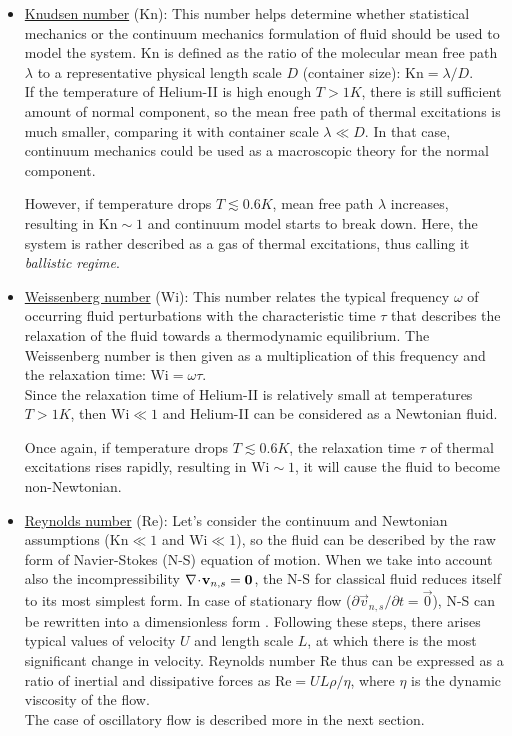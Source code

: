 \begin{itemize}
	\item \underline{Knudsen number} (Kn): This number helps determine whether statistical mechanics or the continuum mechanics formulation of fluid should be used to model the system. Kn is defined as the ratio of the molecular mean free path $\lambda$ to a representative physical length scale $D$ (container size):
	$\text{Kn} = \lambda / D$.\\
	If the temperature of Helium-II is high enough $T > 1\unit{K}$, there is still sufficient amount of normal component, so the mean free path of thermal excitations is much smaller, comparing it with container scale $\lambda \ll D$. In that case, continuum mechanics could be used as a macroscopic theory for the normal component.

	However, if temperature drops $T \lesssim 0.6 \unit{K}$, mean free path $\lambda$ increases, resulting in $\text{Kn} \sim 1$ and continuum model starts to break down. Here, the system is rather described as a gas of thermal excitations, thus calling it \textit{ballistic regime}.

	\item \underline{Weissenberg number} (Wi): This number relates the typical frequency $\omega$ of occurring fluid perturbations with the characteristic time $\tau$ that describes the relaxation of the fluid towards a thermodynamic equilibrium. The Weissenberg number is then given as a multiplication of this frequency and the relaxation time: $\text{Wi} = \omega \tau$.\\
	Since the relaxation time of Helium-II is relatively small at temperatures $T > 1\unit{K}$, then $\text{Wi} \ll 1$ and Helium-II can be considered as a Newtonian fluid.

	Once again, if temperature drops $T \lesssim 0.6 \unit{K}$, the relaxation time $\tau$ of thermal excitations rises rapidly, resulting in $\text{Wi} \sim 1$, it will cause the fluid to become non-Newtonian.

	\item \underline{Reynolds number} (Re): Let's consider the continuum and Newtonian assumptions ($\text{Kn} \ll 1$ and $\text{Wi} \ll 1$), so the fluid can be described by the raw form of Navier-Stokes (N-S) equation of motion. When we take into account also the incompressibility $\nabla \!\cdot\! \mathbf{v}_{n,s} = \mathbf{0}$, the N-S for classical fluid reduces itself to its most simplest form.
	In case of stationary flow ($\partial \vec{v}_{n,s} / \partial t = \vec{0}$), N-S can be rewritten into a dimensionless form \cite{bakalaris}. Following these steps, there arises typical values of velocity $U$ and length scale $L$, at which there is the most significant change in velocity. Reynolds number Re thus can be expressed as a ratio of inertial and dissipative forces as $\text{Re} = U L \rho / \eta$, where $\eta$ is the dynamic viscosity of the flow.\\
	The case of oscillatory flow is described more in the next section.

\end{itemize}

